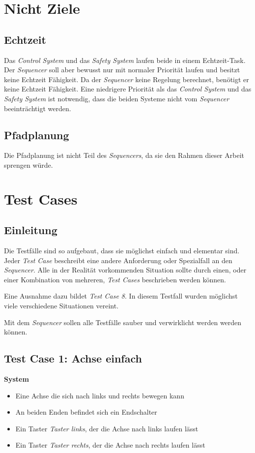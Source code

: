 \section{Nicht Ziele}
\subsection{Echtzeit}
Das \textit{Control System} und das \textit{Safety System} laufen beide in einem Echtzeit-Task.
Der \textit{Sequencer} soll aber bewusst nur mit normaler Priorität laufen und besitzt keine Echtzeit Fähigkeit.
Da der \textit{Sequencer} keine Regelung berechnet, benötigt er keine Echtzeit Fähigkeit.
Eine niedrigere Priorität als das \textit{Control System} und das \textit{Safety System} ist notwendig, dass die beiden Systeme nicht vom \textit{Sequencer} beeinträchtigt werden.


\subsection{Pfadplanung}
Die Pfadplanung ist nicht Teil des \textit{Sequencers}, da sie den Rahmen dieser Arbeit sprengen würde.



\section{Test Cases}
\subsection{Einleitung}
Die Testfälle sind so aufgebaut, dass sie möglichst einfach  und elementar sind.
Jeder \textit{Test Case} beschreibt eine andere Anforderung oder Spezialfall an den \textit{Sequencer}.
Alle in der Realität vorkommenden Situation sollte durch einen, oder einer Kombination von mehreren, \textit{Test Cases} beschrieben werden können.

Eine Ausnahme dazu bildet \textit{Test Case 8}.
In diesem Testfall wurden möglichst viele verschiedene Situationen vereint.

Mit dem \textit{Sequencer} sollen alle Testfälle sauber und verwirklicht werden werden können.


\subsection{Test Case 1: Achse einfach}
\textbf{System}
\begin{itemize}
\item Eine Achse die sich nach links und rechts bewegen kann
\item An beiden Enden befindet sich ein Endschalter
\item Ein Taster \textit{Taster links}, der die Achse nach links laufen lässt
\item Ein Taster \textit{Taster rechts}, der die Achse nach rechts laufen lässt
\end{itemize}

